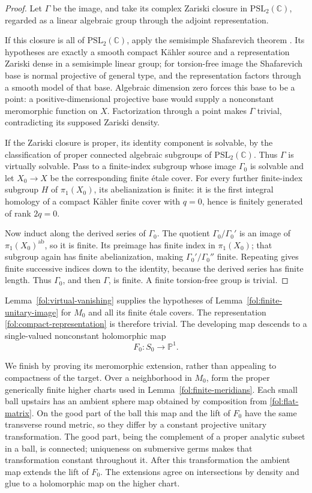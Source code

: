 \documentclass[11pt,letterpaper]{article}
\newcommand{\C}{\mathbb{C}}
\newcommand{\PP}{\mathbb{P}}
\theoremstyle{definition}
\theoremstyle{remark}
\begin{document}
\begin{proof}
Let $\Gamma$ be the image, and take its complex Zariski closure in
$\mathrm{PSL}_2(\C)$, regarded as a linear algebraic group through
the adjoint representation.

If this closure is all of $\mathrm{PSL}_2(\C)$, apply the
semisimple Shafarevich theorem
\cite[Theorem~1]{CCE}.  Its hypotheses are exactly a smooth compact
K\"ahler source and a representation Zariski dense in a semisimple
linear group; for torsion-free image the Shafarevich base is normal
projective of general type, and the representation factors through
a smooth model of that base.  Algebraic dimension zero forces this
base to be a point: a positive-dimensional projective base would
supply a nonconstant meromorphic function on $X$.  Factorization
through a point makes $\Gamma$ trivial, contradicting its supposed
Zariski density.

If the Zariski closure is proper, its identity component is solvable,
by the classification of proper connected algebraic subgroups of
$\mathrm{PSL}_2(\C)$.  Thus $\Gamma$ is virtually solvable.  Pass to
a finite-index subgroup whose image $\Gamma_0$ is solvable and let
$X_0\to X$ be the corresponding finite \'etale cover.
For every further finite-index subgroup $H$ of $\pi_1(X_0)$, its
abelianization is finite: it is the first integral homology of a
compact K\"ahler finite cover with $q=0$, hence is finitely generated
of rank $2q=0$.

Now induct along the derived series of $\Gamma_0$.
The quotient $\Gamma_0/\Gamma_0'$ is an image of
$\pi_1(X_0)^{\mathrm{ab}}$, so it is finite.
Its preimage has finite index in $\pi_1(X_0)$; that subgroup again
has finite abelianization, making $\Gamma_0'/\Gamma_0''$ finite.
Repeating gives finite successive indices down to the identity,
because the derived series has finite length.
Thus $\Gamma_0$, and then $\Gamma$, is finite.
A finite torsion-free group is trivial.
\end{proof}

Lemma~\ref{fol:virtual-vanishing} supplies the hypotheses of
Lemma~\ref{fol:finite-unitary-image} for $M_0$ and all its finite
\'etale covers.  The representation
\eqref{fol:compact-representation} is therefore trivial.  The
developing map descends to a single-valued nonconstant holomorphic map
\[
 F_0\colon S_0\longrightarrow\PP^1.
\]

We finish by proving its meromorphic extension, rather than appealing
to compactness of the target.  Over a neighborhood in $M_0$, form the
proper generically finite higher charts used in
Lemma~\ref{fol:finite-meridians}.  Each small ball upstairs has an
ambient sphere map obtained by composition from
\eqref{fol:flat-matrix}.  On the good part of the ball this map and
the lift of $F_0$ have the same transverse round metric, so they differ
by a constant projective unitary transformation.  The good part,
being the complement of a proper analytic subset in a ball, is
connected; uniqueness on submersive germs makes that transformation
constant throughout it.  After this transformation the ambient map
extends the lift of $F_0$.  The extensions agree on intersections
by density and glue to a holomorphic map on the higher chart.
\end{document}
